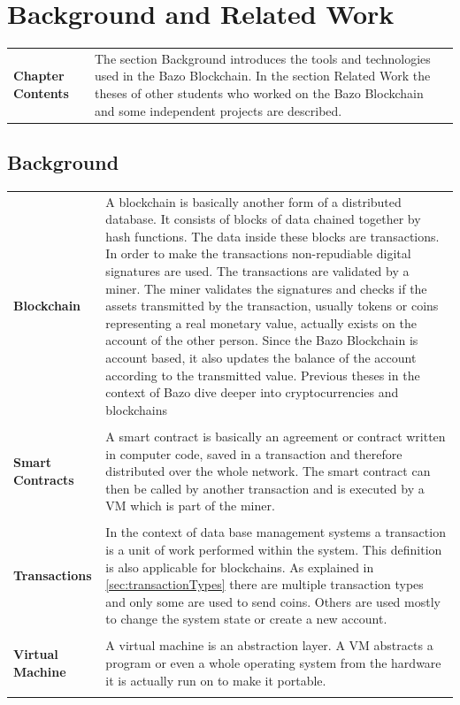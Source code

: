 \chapter{Background and Related Work}
\thispagestyle{main} %
\begin{tabular}[t]{ p{3cm} p{12.5cm}}
\raggedright
\textbf{Chapter Contents} & 
The section Background introduces the tools and technologies used in the Bazo Blockchain. In the section Related Work the theses of other students who worked on the Bazo Blockchain and some independent projects are described.
\end{tabular}

\section{Background}
\begin{tabular}[t]{ p{3cm} p{12.5cm}}
\textbf{Blockchain} & 
A blockchain is basically another form of a distributed database. It consists of blocks of data chained together by hash functions. The data inside these blocks are transactions. In order to make the transactions non-repudiable digital signatures are used. The transactions are validated by a miner. The miner validates the signatures and checks if the assets transmitted by the transaction, usually tokens or coins representing a real monetary value, actually exists on the account of the other person. Since the Bazo Blockchain is account based, it also updates the balance of the account according to the transmitted value. Previous theses in the context of Bazo dive deeper into cryptocurrencies and blockchains \cite{ba_miner} \cite{ba_client}  \\ \\

\raggedright
\textbf{Smart Contracts} &
A smart contract is basically an agreement or contract written in computer code, saved in a transaction and therefore distributed over the whole network. The smart contract can then be called by another transaction and is executed by a VM which is part of the miner. \\ \\

\textbf{Transactions} &
In the context of data base management systems a transaction is a unit of work performed within the system. \cite{dbtransaction} This definition is also applicable for blockchains. As explained in \autoref{sec:transactionTypes}
there are multiple transaction types and only some are used to send coins. Others are used mostly to change the system state or create a new account. \\ \\

\raggedright
\textbf{Virtual Machine} &
A virtual machine is an abstraction layer. A VM abstracts a program or even a whole operating system from the hardware it is actually run on to make it portable. \\ \\
\end{tabular}
\pagebreak

